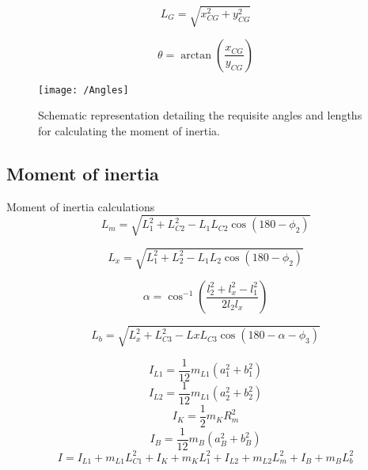 \begin{itemize}
	\begin{equation}
		L_G = \sqrt{x_{CG}^2 + y_{CG}^2}
	\end{equation}
	
	\begin{equation}
		\theta = \arctan\left(\frac{{x_{CG}}}{{y_{CG}}}\right)
	\end{equation}
	
	
	\begin{figure}[h]
		\centering
		\texttt{[image: /Angles]}
		\caption[Moment of inertia Schematic representation]{Schematic representation detailing the requisite angles and lengths for calculating the moment of inertia.}
		\label{fig:Schematic representation detailing the requisite angles and lengths for calculating the moment of inertia.}
	\end{figure}
	
	\subsection{Moment of inertia}
	Moment of inertia calculations 
	\begin{equation}
		L_m = \sqrt{L_1^2 + L_{C2}^2 - L_1 L_{C2} \cos(180 - \phi_2)}
	\end{equation}
	
	\begin{equation}
		L_{x} = \sqrt{L_1^2 + L_2^2 - L_1 L_2 \cos(180 - \phi_2)}
	\end{equation}
	
	
	\begin{equation}
		\alpha = \cos^{-1} \left( \frac{l_2^2 + l_{x}^2 - l_1^2}{2 l_2 l_{x}} \right) 
	\end{equation}
	
	
	\begin{equation}
		L_b = \sqrt{L_{x}^2 + L_{C3}^2 - Lx L_{C3} \cos(180 - \alpha - \phi_3 )}
	\end{equation}
	
	\begin{equation}
		I_{L1} = \frac{1}{12} m_{L1} (a_1^2 + b_1^2)
	\end{equation}
	\begin{equation}
		I_{L2} = \frac{1}{12} m_{L1} (a_2^2 + b_2^2)
	\end{equation}
	\begin{equation}
		I_K = \frac{1}{2} m_K R_m^2
	\end{equation}
	\begin{equation}
		I_B = \frac{1}{12} m_B (a_B^2 + b_B^2)
	\end{equation}
	\begin{equation}
		I = I_{L1} + m_{L1} L_{C1}^2 + I_K + m_K L_1^2 + I_{L2} + m_{L2} L_m^2 + I_B + m_B L_b^2
	\end{equation}
	

\end{itemize}
